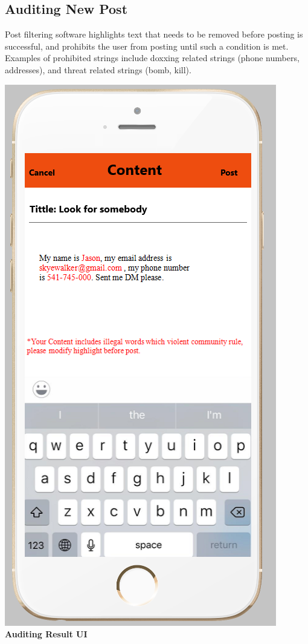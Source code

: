 \documentclass[12pt]{article}
\begin{document}
\subsection{Auditing New Post}
Post filtering software highlights text that needs to be removed before posting is successful, and prohibits the user from posting until such a condition is met. Examples of prohibited strings include doxxing related strings (phone numbers, addresses), and threat related strings (bomb, kill).
\begin{center}
\includegraphics[scale=0.30]{img/ui/bad-post}\linebreak
\textbf{Auditing Result UI}

  \end{center}
\end{document}
